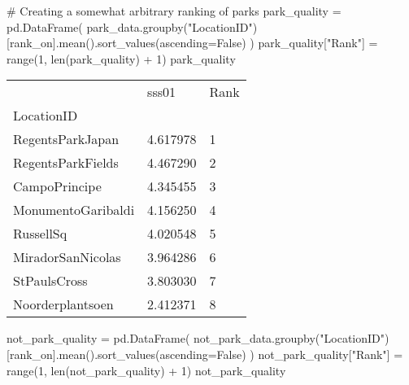 \documentclass[
  letterpaper,
  DIV=11,
  numbers=noendperiod]{scrartcl}
\newenvironment{Shaded}{\begin{snugshade}}{\end{snugshade}}
\newcommand{\BuiltInTok}[1]{\textcolor[rgb]{0.00,0.23,0.31}{#1}}
\newcommand{\CommentTok}[1]{\textcolor[rgb]{0.37,0.37,0.37}{#1}}
\newcommand{\DecValTok}[1]{\textcolor[rgb]{0.68,0.00,0.00}{#1}}
\newcommand{\NormalTok}[1]{\textcolor[rgb]{0.00,0.23,0.31}{#1}}
\newcommand{\OperatorTok}[1]{\textcolor[rgb]{0.37,0.37,0.37}{#1}}
\newcommand{\StringTok}[1]{\textcolor[rgb]{0.13,0.47,0.30}{#1}}
\newcommand{\VariableTok}[1]{\textcolor[rgb]{0.07,0.07,0.07}{#1}}
\begin{document}
\begin{Shaded}
\begin{Highlighting}[]
\CommentTok{\# Creating a somewhat arbitrary ranking of parks}
\NormalTok{park\_quality }\OperatorTok{=}\NormalTok{ pd.DataFrame(}
\NormalTok{    park\_data.groupby(}\StringTok{"LocationID"}\NormalTok{)[rank\_on].mean().sort\_values(ascending}\OperatorTok{=}\VariableTok{False}\NormalTok{)}
\NormalTok{)}
\NormalTok{park\_quality[}\StringTok{"Rank"}\NormalTok{] }\OperatorTok{=} \BuiltInTok{range}\NormalTok{(}\DecValTok{1}\NormalTok{, }\BuiltInTok{len}\NormalTok{(park\_quality) }\OperatorTok{+} \DecValTok{1}\NormalTok{)}
\NormalTok{park\_quality}
\end{Highlighting}
\end{Shaded}

\begin{longtable}[]{@{}lll@{}}
\toprule\noalign{}
& sss01 & Rank \\
LocationID & & \\
\midrule\noalign{}
\endhead
\bottomrule\noalign{}
\endlastfoot
RegentsParkJapan & 4.617978 & 1 \\
RegentsParkFields & 4.467290 & 2 \\
CampoPrincipe & 4.345455 & 3 \\
MonumentoGaribaldi & 4.156250 & 4 \\
RussellSq & 4.020548 & 5 \\
MiradorSanNicolas & 3.964286 & 6 \\
StPaulsCross & 3.803030 & 7 \\
Noorderplantsoen & 2.412371 & 8 \\
\end{longtable}

\begin{Shaded}
\begin{Highlighting}[]
\NormalTok{not\_park\_quality }\OperatorTok{=}\NormalTok{ pd.DataFrame(}
\NormalTok{    not\_park\_data.groupby(}\StringTok{"LocationID"}\NormalTok{)[rank\_on].mean().sort\_values(ascending}\OperatorTok{=}\VariableTok{False}\NormalTok{)}
\NormalTok{)}
\NormalTok{not\_park\_quality[}\StringTok{"Rank"}\NormalTok{] }\OperatorTok{=} \BuiltInTok{range}\NormalTok{(}\DecValTok{1}\NormalTok{, }\BuiltInTok{len}\NormalTok{(not\_park\_quality) }\OperatorTok{+} \DecValTok{1}\NormalTok{)}
\NormalTok{not\_park\_quality}
\end{Highlighting}
\end{Shaded}
\end{document}
